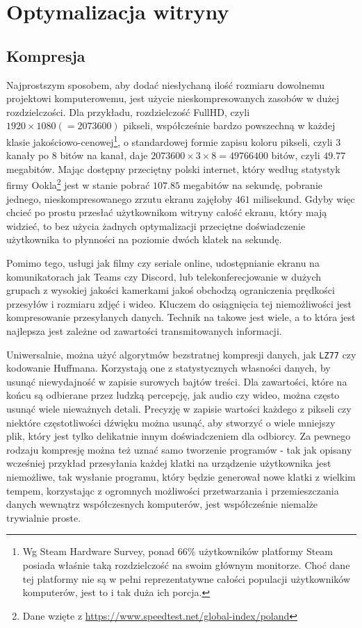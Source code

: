 \documentclass[licencjacka]{pracadypl}
\begin{document}
\chapter{Optymalizacja witryny}
\section{Kompresja}
Najprostszym sposobem, aby dodać niesłychaną ilość rozmiaru dowolnemu projektowi komputerowemu, jest użycie nieskompresowanych zasobów w dużej rozdzielczości. Dla przykładu, rozdzielczość FullHD, czyli $1920\times1080\left(=2073600\right)$ pikseli, współcześnie bardzo powszechną w każdej klasie jakościowo-cenowej\footnote{Wg Steam Hardware Survey, ponad 66\% użytkowników platformy Steam posiada właśnie taką rozdzielczość na swoim głównym monitorze. Choć dane tej platformy nie są w pełni reprezentatywne całości populacji użytkowników komputerów, jest to i tak duża ich porcja.}, o standardowej formie zapisu koloru pikseli, czyli 3 kanały po 8 bitów na kanał, daje $2073600\times3\times8 = 49766400$ bitów, czyli $49.77$ megabitów. Mając dostępny przeciętny polski internet, który według statystyk firmy Ookla\footnote{Dane wzięte z \url{https://www.speedtest.net/global-index/poland}} jest w stanie pobrać $107.85$ megabitów na sekundę, pobranie jednego, nieskompresowanego zrzutu ekranu zajęłoby $461$ milisekund. Gdyby więc chcieć po prostu przesłać użytkownikom witryny całość ekranu, który mają widzieć, to bez użycia żadnych optymalizacji przeciętne doświadczenie użytkownika to płynności na poziomie dwóch klatek na sekundę.

Pomimo tego, usługi jak filmy czy seriale online, udostępnianie ekranu na komunikatorach jak Teams czy Discord, lub telekonferecjowanie w dużych grupach z wysokiej jakości kamerkami jakoś obchodzą ograniczenia prędkości przesyłów i rozmiaru zdjęć i wideo. Kluczem do osiągnięcia tej niemożliwości jest kompresowanie przesyłanych danych. Technik na takowe jest wiele, a to która jest najlepsza jest zależne od zawartości transmitowanych informacji.

Uniwersalnie, można użyć algorytmów bezstratnej kompresji danych, jak \texttt{LZ77} czy kodowanie Huffmana. Korzystają one z statystycznych własności danych, by usunąć niewydajność w zapisie surowych bajtów treści. Dla zawartości, które na końcu są odbierane przez ludzką percepcję, jak audio czy wideo, można często usunąć wiele nieważnych detali. Precyzję w zapisie wartości każdego z pikseli czy niektóre częstotliwości dźwięku można usunąć, aby stworzyć o wiele mniejszy plik, który jest tylko delikatnie innym doświadczeniem dla odbiorcy. Za pewnego rodzaju kompresję można też uznać samo tworzenie programów - tak jak opisany wcześniej przykład przesyłania każdej klatki na urządzenie użytkownika jest niemożliwe, tak wysłanie programu, który będzie generował nowe klatki z wielkim tempem, korzystając z ogromnych możliwości przetwarzania i przemieszczania danych wewnątrz współczesnych komputerów, jest współcześnie niemalże trywialnie proste.
\end{document}
